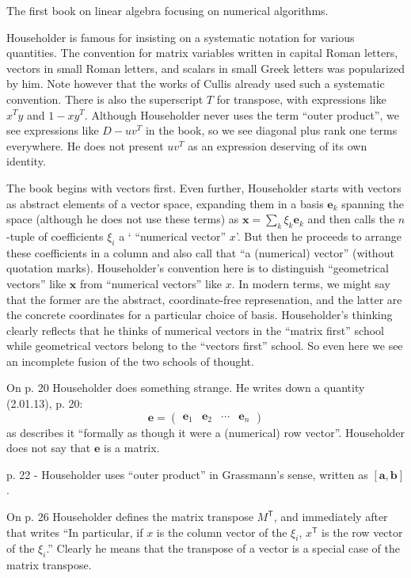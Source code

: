 The first book on linear algebra focusing on numerical algorithms.

Householder is famous for insisting on a systematic notation for various quantities.
The convention for matrix variables written in capital Roman letters, vectors in small Roman letters, and scalars in small Greek letters was popularized by him. Note however that the works of Cullis already used such a systematic convention.
There is also the superscript $T$ for transpose, with expressions like $x^T y$ and $1 - x y^T$.
Although Householder never uses the term ``outer product'', we see expressions like $D - u v^T$ in the book, so we see diagonal plus rank one terms everywhere. He does not present $u v^T$ as an expression deserving of its own identity.

The book begins with vectors first. Even further, Householder starts with vectors
as abstract elements of a vector space, expanding them in a basis $\mathbf e_k$
spanning the space (although he does not use these terms) as $\mathbf x = \sum_k \xi_k \mathbf e_k$
and then calls the $n$-tuple of coefficients $\xi_i$ a ` ``numerical vector''
$x$'. But then he proceeds to arrange these coefficients in a column and also
call that ``a (numerical) vector'' (without quotation marks).
Householder's convention here is to distinguish  ``geometrical vectors''
like $\mathbf x$ from ``numerical vectors'' like $x$. In modern terms, we might
say that the former are the abstract, coordinate-free represenation, and the
latter are the concrete coordinates for a particular choice of basis.
Householder's thinking clearly reflects that he thinks of numerical vectors in the
``matrix first'' school while geometrical vectors belong to the ``vectors first''
school. So even here we see an incomplete fusion of the two schools of thought.

On p. 20 Householder does something strange. He writes down a quantity (2.01.13), p. 20:
\[
\mathbf e = \begin{pmatrix}\mathbf e_1 & \mathbf e_2 & \cdots & \mathbf e_n\end{pmatrix}
\]
as describes it ``formally as though it were a (numerical) row vector''.
Householder does not say that $\mathbf e$ is a matrix.

p. 22 - Householder uses ``outer product'' in Grassmann's sense, written as $[\mathbf a, \mathbf b]$.

On p. 26 Householder defines the matrix transpose $M^{\mathsf T}$, and immediately
after that writes ``In particular, if $x$ is the column vector of the $\xi_i$,
$x^{\mathsf T}$ is the row vector of the $\xi_i$.'' Clearly he means that the
transpose of a vector is a special case of the matrix transpose.

